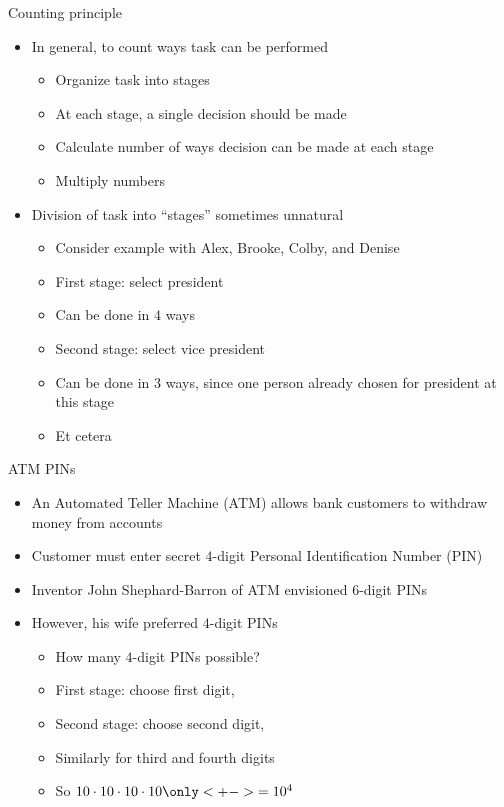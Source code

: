 \documentclass[handout]{beamer}
\theoremstyle{definition}
\begin{document}
\begin{frame}{Counting principle}
\begin{itemize}
\item In general, to count ways task can be performed
\begin{itemize}
\item Organize task into stages
\item At each stage, a single decision should be made
\item Calculate number of ways decision can
be made at each stage
\item Multiply numbers
\end{itemize}
\item Division of task into ``stages'' sometimes unnatural
\begin{example}
\begin{itemize}
\item Consider example with Alex, Brooke, Colby, and Denise
\item First stage: select president
\item Can be done in $4$ ways
\item Second stage: select vice president
\item Can be done in $3$ ways, since one person already
chosen for president at this stage
\item Et cetera
\end{itemize}
\end{example}
\end{itemize}
\end{frame}

\begin{frame}{ATM PINs}
\begin{itemize}
\item An Automated Teller Machine (ATM)
allows bank customers to withdraw money from accounts
\item Customer must enter secret $4$-digit
Personal Identification Number (PIN)
\item Inventor John Shephard-Barron of ATM envisioned $6$-digit PINs
\item However, his wife preferred $4$-digit PINs
\begin{example}
\begin{itemize}
\item How many $4$-digit PINs possible?
\item First stage: choose first digit, 
\item Second stage: choose second digit, 
\item Similarly for third and fourth digits
\item So $10\cdot 10\cdot 10\cdot 10\only<+->{=10^4}$
\end{itemize}
\end{example}
\end{itemize}
\end{frame}
\end{document}
